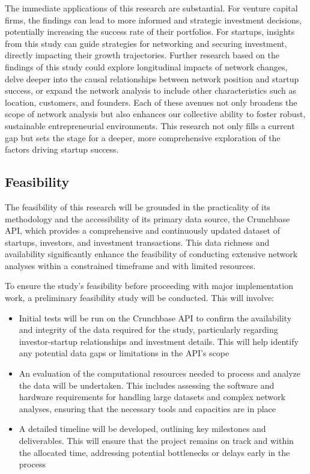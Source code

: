 \documentclass[a4paper,11pt]{article}
\begin{document}
The immediate applications of this research are substantial. For venture capital firms, the findings can lead to more informed and strategic investment decisions, potentially increasing the success rate of their portfolios. For startups, insights from this study can guide strategies for networking and securing investment, directly impacting their growth trajectories. Further research based on the findings of this study could explore longitudinal impacts of network changes, delve deeper into the causal relationships between network position and startup success, or expand the network analysis to include other characteristics such as location, customers, and founders. Each of these avenues not only broadens the scope of network analysis but also enhances our collective ability to foster robust, sustainable entrepreneurial environments. This research not only fills a current gap but sets the stage for a deeper, more comprehensive exploration of the factors driving startup success.

\subsection{Feasibility}

The feasibility of this research will be grounded in the practicality of its methodology and the accessibility of its primary data source, the Crunchbase API, which provides a comprehensive and continuously updated dataset of startups, investors, and investment transactions. This data richness and availability significantly enhance the feasibility of conducting extensive network analyses within a constrained timeframe and with limited resources.

To ensure the study's feasibility before proceeding with major implementation work, a preliminary feasibility study will be conducted. This will involve:
\begin{itemize}
    \item Initial tests will be run on the Crunchbase API to confirm the availability and integrity of the data required for the study, particularly regarding investor-startup relationships and investment details. This will help identify any potential data gaps or limitations in the API's scope
    \item An evaluation of the computational resources needed to process and analyze the data will be undertaken. This includes assessing the software and hardware requirements for handling large datasets and complex network analyses, ensuring that the necessary tools and capacities are in place
    \item A detailed timeline will be developed, outlining key milestones and deliverables. This will ensure that the project remains on track and within the allocated time, addressing potential bottlenecks or delays early in the process
\end{itemize}
\end{document}
